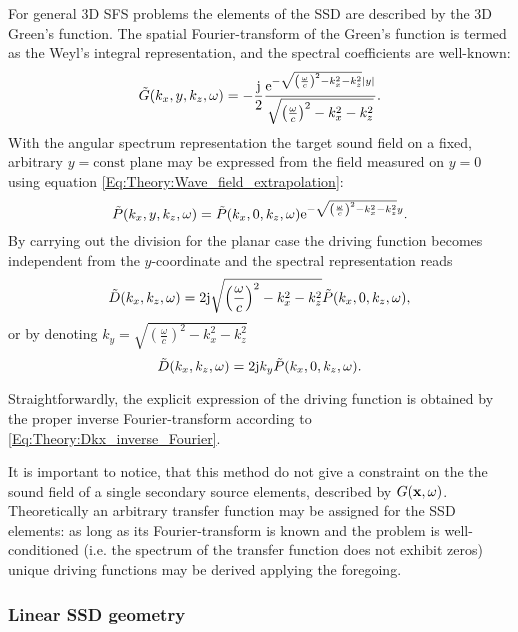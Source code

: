 \vspace{3mm}
For general 3D SFS problems the elements of the SSD are described by the 3D Green's function. The spatial Fourier-transform of the Green's function is termed as the Weyl's integral representation, and the spectral coefficients are well-known:
\begin{equation}
\tilde{G}(k_x,y,k_z,\omega) = -\frac{\mathrm{j}}{2} \frac{\mathrm{e}^{-\sqrt{ \left( \frac{\omega}{c} \right)^2 - k_x^2 - k_z^2  } |y| }}{\sqrt{ \left( \frac{\omega}{c} \right)^2 - k_x^2 - k_z^2  } }.
\end{equation}
With the angular spectrum representation the target sound field on a fixed, arbitrary $y=\mathrm{const}$ plane may be expressed from the field measured on $y=0$ using equation \eqref{Eq:Theory:Wave_field_extrapolation}:
\begin{equation}
\tilde{P}(k_x,y,k_z,\omega) = \tilde{P}(k_x,0,k_z,\omega) \mathrm{e}^{-\sqrt{ \left( \frac{\omega}{c} \right)^2 - k_x^2 - k_z^2  } y}.
\end{equation}
By carrying out the division for the planar case the driving function becomes independent from the $y$-coordinate and the spectral representation reads
\begin{equation}
\tilde{D}(k_x,k_z,\omega) = 2\mathrm{j} \sqrt{ \left( \frac{\omega}{c} \right)^2 - k_x^2 - k_z^2  } \tilde{P}(k_x,0,k_z,\omega),
\label{Eq:Theory:Planar_explicit_driv_fun}
\end{equation}
or by denoting $k_y  = \sqrt{ \left( \frac{\omega}{c} \right)^2 - k_x^2 - k_z^2  }$
\begin{equation}
\tilde{D}(k_x,k_z,\omega) = 2\mathrm{j} k_y \tilde{P}(k_x,0,k_z,\omega).
\end{equation}

Straightforwardly, the explicit expression of the driving function is obtained by the proper inverse Fourier-transform according to \eqref{Eq:Theory:Dkx_inverse_Fourier}.

\vspace{3mm}
It is important to notice, that this method do not give a constraint on the the sound field of a single secondary source elements, described by $G(\mathbf{x},\omega)$. Theoretically an arbitrary transfer function may be assigned for the SSD elements: as long as its Fourier-transform is known and the problem is well-conditioned (i.e. the spectrum of the transfer function does not exhibit zeros) unique driving functions may be derived applying the foregoing.


\subsubsection{Linear SSD geometry}

